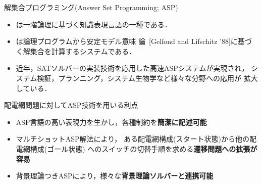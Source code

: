 \documentclass[dvipdfmx,11pt]{beamer}
\begin{document}
\begin{frame}{解集合プログラミング(Answer Set Programming; ASP)}
 \begin{itemize}
  \item {}は一階論理に基づく知識表現言語の一種である．
  \item {}は論理プログラムから安定モデル意味
        論~[Gelfond and Lifschitz '88]に基づく解集合を計算するシステムである．
  \item 近年，SATソルバーの実装技術を応用した高速ASPシステムが実現され，
        システム検証，プランニング，システム生物学など様々な分野への応用が
        拡大している．
 \end{itemize}
 \vfill
 \begin{alertblock}{配電網問題に対してASP技術を用いる利点}
  \begin{itemize}
   \item ASP言語の高い表現力を生かし，各種制約を\textbf{簡潔に記述可能}
   \item マルチショットASP解法により，
         ある配電網構成(スタート状態)から他の配電網構成(ゴール状態)
         へのスイッチの切替手順を求める\textbf{遷移問題への拡張が容易}
   \item 背景理論つきASPにより，様々な\textbf{背景理論ソルバーと連携可能}
  \end{itemize}
 \end{alertblock}
\end{frame}
\end{document}
